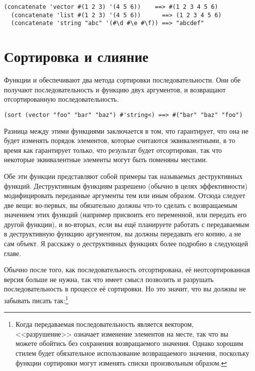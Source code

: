 \begin{lstlisting}[style=lisprepl]
  (concatenate 'vector #(1 2 3) '(4 5 6))    ==> #(1 2 3 4 5 6)
  (concatenate 'list #(1 2 3) '(4 5 6))      ==> (1 2 3 4 5 6)
  (concatenate 'string "abc" '(#\d #\e #\f)) ==> "abcdef"
\end{lstlisting}

\section{Сортировка и слияние}

Функции  и  обеспечивают два метода сортировки
последовательности.  Они обе получают последовательность и функцию двух аргументов, и
возвращают отсортированную последовательность.

\begin{lstlisting}[style=lisprepl]
  (sort (vector "foo" "bar" "baz") #'string<) ==> #("bar" "baz" "foo")
\end{lstlisting}

Разница между этими функциями заключается в том, что  гарантирует, что
она не будет изменять порядок элементов, которые считаются эквивалентными, в то время как
 гарантирует только, что результат будет отсортирован, так что некоторые
эквивалентные элементы могут быть поменяны местами.

Обе эти функции представляют собой примеры так называемых деструктивных функций.  Деструктивным
функциям разрешено (обычно в целях эффективности) модифицировать переданные аргументы тем
или иным образом.  Отсюда следует две вещи: во-первых, вы обязательно должны что-то сделать с
возвращаемым значением этих функций (например присвоить его переменной, или передать его
другой функции), и во-вторых, если вы ещё планируете работать с передаваемым в
деструктивную функцию аргументом, вы должны передавать его копию, а не сам объект.
Я расскажу о деструктивных функциях более подробно в следующей главе.

Обычно после того, как последовательность отсортирована, её неотсортированная версия
больше не нужна, так что имеет смысл
позволить  и  разрушать последовательность в процессе её
сортировки.  Но это значит, что вы должны не забывать писать так:\footnote{Когда
  передаваемая последовательность является вектором, <<разрушение>> означает изменение
  элементов на месте, так что вы можете обойтись без сохранения возвращаемого значения.
  Однако хорошим стилем будет обязательное использование возвращаемого значения,
  поскольку функции сортировки могут изменять списки произвольным образом.}

